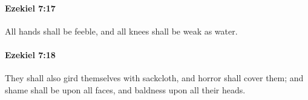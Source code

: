 		\paragraph{Ezekiel 7:17} %
			\label{EZEKIEL-7-17}

			All hands shall be feeble, and all knees shall be weak as water.


		\paragraph{Ezekiel 7:18} %
			\label{EZEKIEL-7-18}

			They shall also gird themselves with sackcloth, and horror shall cover them; and shame shall be upon all faces, and baldness upon all their heads.



